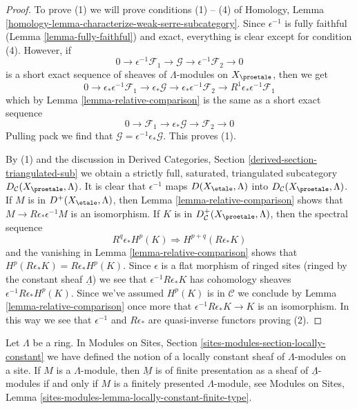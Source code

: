 \begin{proof}
To prove (1) we will prove conditions (1) -- (4) of
Homology, Lemma \ref{homology-lemma-characterize-weak-serre-subcategory}.
Since $\epsilon^{-1}$ is fully faithful (Lemma \ref{lemma-fully-faithful})
and exact, everything is clear except for condition (4).
However, if
$$
0 \to \epsilon^{-1}\mathcal{F}_1 \to \mathcal{G} \to
\epsilon^{-1}\mathcal{F}_2 \to 0
$$
is a short exact sequence of sheaves of $\Lambda$-modules on $X_\proetale$,
then we get
$$
0 \to \epsilon_*\epsilon^{-1}\mathcal{F}_1 \to \epsilon_*\mathcal{G} \to
\epsilon_*\epsilon^{-1}\mathcal{F}_2 \to
R^1\epsilon_*\epsilon^{-1}\mathcal{F}_1
$$
which by Lemma \ref{lemma-relative-comparison}
is the same as a short exact sequence
$$
0 \to \mathcal{F}_1 \to \epsilon_*\mathcal{G} \to \mathcal{F}_2 \to 0
$$
Pulling pack we find that $\mathcal{G} = \epsilon^{-1}\epsilon_*\mathcal{G}$.
This proves (1).

\medskip\noindent
By (1) and the discussion in
Derived Categories, Section \ref{derived-section-triangulated-sub}
we obtain a strictly full, saturated, triangulated subcategory
$D_\mathcal{C}(X_\proetale, \Lambda)$. It is clear that $\epsilon^{-1}$
maps $D(X_\etale, \Lambda)$ into $D_\mathcal{C}(X_\proetale, \Lambda)$.
If $M$ is in $D^+(X_\etale, \Lambda)$, then
Lemma \ref{lemma-relative-comparison} shows that
$M \to R\epsilon_*\epsilon^{-1}M$ is an isomorphism.
If $K$ is in $D^+_\mathcal{C}(X_\proetale, \Lambda)$, then the
spectral sequence
$$
R^q\epsilon_*H^p(K) \Rightarrow H^{p + q}(R\epsilon_*K)
$$
and the vanishing in Lemma \ref{lemma-relative-comparison}
shows that $H^p(R\epsilon_*K) = R\epsilon_*H^p(K)$.
Since $\epsilon$ is a flat morphism of ringed sites (ringed
by the constant sheaf $\underline{\Lambda}$) we see that
$\epsilon^{-1}R\epsilon_*K$ has cohomology sheaves
$\epsilon^{-1}R\epsilon_*H^p(K)$. Since we've assumed
$H^p(K)$ is in $\mathcal{C}$ we
conclude by Lemma \ref{lemma-relative-comparison}
once more that
$\epsilon^{-1}R\epsilon_*K \to K$ is an isomorphism.
In this way we see that $\epsilon^{-1}$ and $R\epsilon_*$
are quasi-inverse functors proving (2).
\end{proof}

\noindent
Let $\Lambda$ be a ring. In
Modules on Sites, Section \ref{sites-modules-section-locally-constant}
we have defined the notion of a locally constant sheaf of $\Lambda$-modules
on a site. If $M$ is a $\Lambda$-module, then $\underline{M}$ is of finite
presentation as a sheaf of $\underline{\Lambda}$-modules if and only
if $M$ is a finitely presented $\Lambda$-module, see
Modules on Sites, Lemma \ref{sites-modules-lemma-locally-constant-finite-type}.

